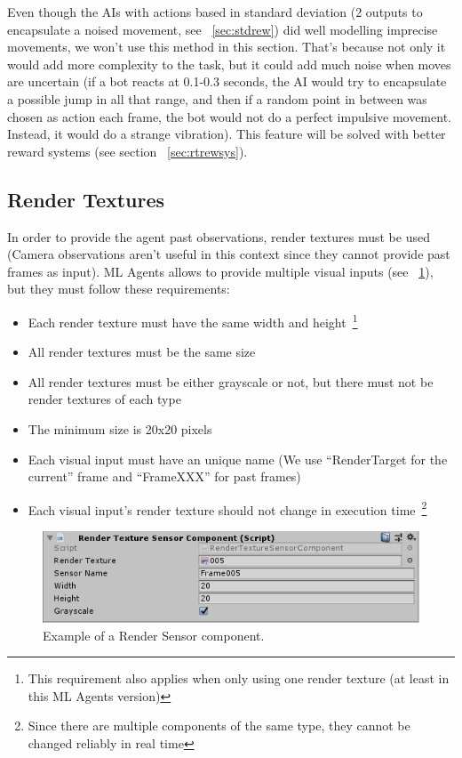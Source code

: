 Even though the AIs with actions based in standard deviation (2 outputs to encapsulate a noised movement, see ~\ref{sec:stdrew}) did well modelling imprecise movements, we won't use this method in this section. That's because not only it would add more complexity to the task, but it could add much noise when moves are uncertain (if a bot reacts at 0.1-0.3 seconds, the AI would try to encapsulate a possible jump in all that range, and then if a random point in between was chosen as action each frame, the bot would not do a perfect impulsive movement. Instead, it would do a strange vibration). This feature will be solved with better reward systems (see section ~\ref{sec:rtrewsys}).

\subsection{Render Textures}

In order to provide the agent past observations, render textures must be used (Camera observations aren't useful in this context since they cannot provide past frames as input). ML Agents allows to provide multiple visual inputs (see ~\ref{fig:rendersens}), but they must follow these requirements:

\begin{itemize}
 \item Each render texture must have the same width and height~\footnote{This requirement also applies when only using one render texture (at least in this ML Agents version)}
 \item All render textures must be the same size
 \item All render textures must be either grayscale or not, but there must not be render textures of each type
 \item The minimum size is 20x20 pixels
 \item Each visual input must have an unique name (We use ``RenderTarget for the current'' frame and ``FrameXXX'' for past frames)
 \item Each visual input's render texture should not change in execution time~\footnote{Since there are multiple components of the same type, they cannot be changed reliably in real time}
\end{itemize}

\begin{figure}[h]
  \centering
		\includegraphics[width=.6\textwidth]{img/rendersensor.png}
  \caption{Example of a Render Sensor component.}
  \label{fig:rendersens}
\end{figure}

